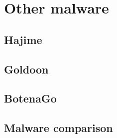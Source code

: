 \chapter{Other malware}

\section{Hajime}

\section{Goldoon}

\section{BotenaGo}

\section{Malware comparison}

